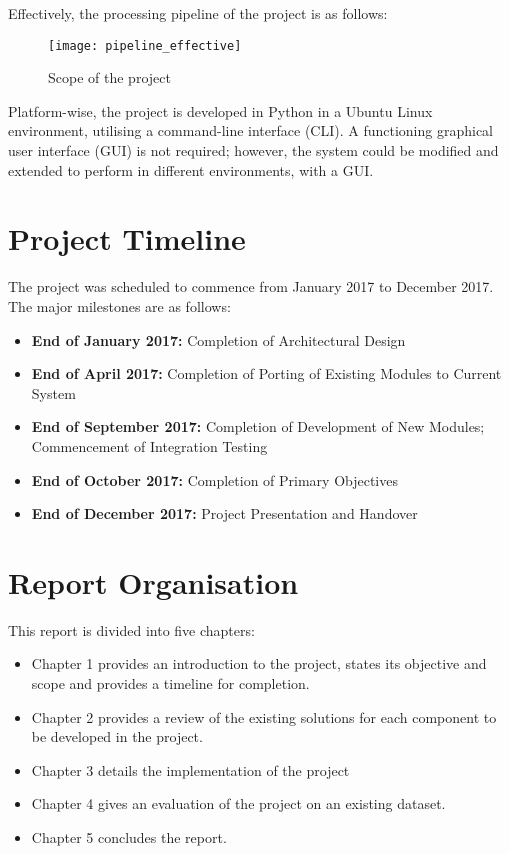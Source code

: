 Effectively, the processing pipeline of the project is as follows:

\begin{figure}[h]
\begin{center}
    \texttt{[image: pipeline\_effective]}
    \caption{Scope of the project}\label{scope}
\end{center}
\end{figure}
    
Platform-wise, the project is developed in Python in a Ubuntu Linux environment,
utilising a command-line interface (CLI). A functioning graphical user interface
(GUI) is not required; however, the system could
be modified and extended to perform in different environments, with a GUI\@.

\section{Project Timeline}

The project was scheduled to commence from January 2017 to December 2017. The major
milestones are as follows:

\begin{itemize}
    \item \textbf{End of January 2017:} Completion of Architectural Design
    \item \textbf{End of April 2017:} Completion of Porting of Existing Modules
    to Current System
    \item \textbf{End of September 2017:} Completion of Development of New Modules;
    Commencement of Integration Testing
    \item \textbf{End of October 2017:} Completion of Primary Objectives
    \item \textbf{End of December 2017:} Project Presentation and Handover
\end{itemize}

\section{Report Organisation}

This report is divided into five chapters:

\begin{itemize}
    \item Chapter 1 provides an introduction to the project, states its objective
    and scope and provides a timeline for completion.
    \item Chapter 2 provides a review of the existing solutions for each component
    to be developed in the project.
    \item Chapter 3 details the implementation of the project
    \item Chapter 4 gives an evaluation of the project on an existing dataset.
    \item Chapter 5 concludes the report.
\end{itemize}